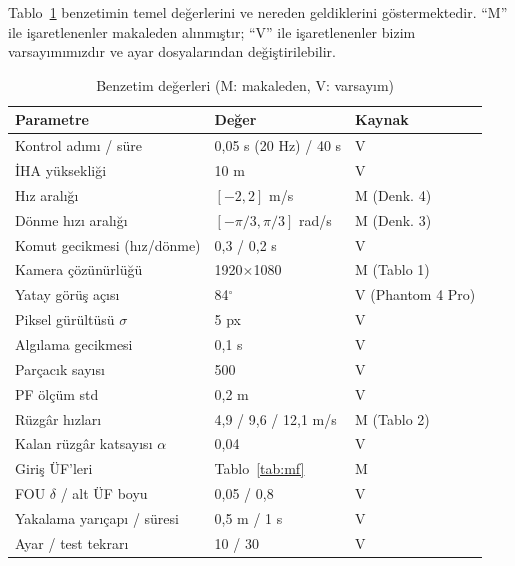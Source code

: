 \documentclass[conference,a4paper]{IEEEtran}
\begin{document}
Tablo~\ref{tab:params} benzetimin temel değerlerini ve nereden geldiklerini göstermektedir. ``M'' ile işaretlenenler makaleden alınmıştır; ``V'' ile işaretlenenler bizim varsayımımızdır ve ayar dosyalarından değiştirilebilir.

\begin{table}[t]
\centering
\caption{Benzetim değerleri (M: makaleden, V: varsayım)}
\label{tab:params}
\footnotesize
\setlength{\tabcolsep}{4pt}
\begin{tabular}{@{}lll@{}}
\toprule
Parametre & Değer & Kaynak \\
\midrule
Kontrol adımı / süre & 0,05 s (20 Hz) / 40 s & V \\
İHA yüksekliği & 10 m & V \\
Hız aralığı & $[-2,2]$ m/s & M (Denk. 4) \\
Dönme hızı aralığı & $[-\pi/3,\pi/3]$ rad/s & M (Denk. 3) \\
Komut gecikmesi (hız/dönme) & 0,3 / 0,2 s & V \\
Kamera çözünürlüğü & 1920$\times$1080 & M (Tablo 1) \\
Yatay görüş açısı & 84$^\circ$ & V (Phantom 4 Pro) \\
Piksel gürültüsü $\sigma$ & 5 px & V \\
Algılama gecikmesi & 0,1 s & V \\
Parçacık sayısı & 500 & V \\
PF ölçüm std & 0,2 m & V \\
Rüzgâr hızları & 4,9 / 9,6 / 12,1 m/s & M (Tablo 2) \\
Kalan rüzgâr katsayısı $\alpha$ & 0,04 & V \\
Giriş ÜF'leri & Tablo~\ref{tab:mf} & M \\
FOU $\delta$ / alt ÜF boyu & 0,05 / 0,8 & V \\
Yakalama yarıçapı / süresi & 0,5 m / 1 s & V \\
Ayar / test tekrarı & 10 / 30 & V \\
\bottomrule
\end{tabular}
\end{table}
\end{document}
